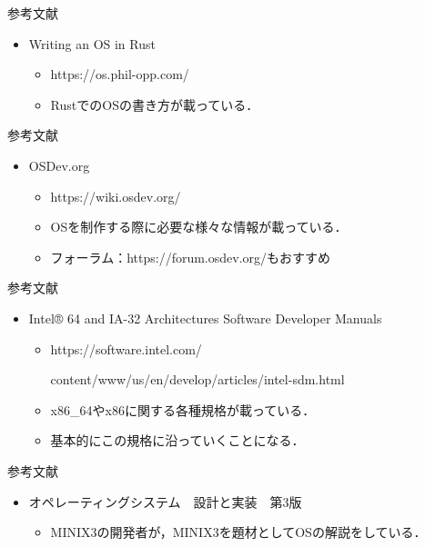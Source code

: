 \documentclass[titlepage,dvipdfmx,uplatex,a4j,12pt]{beamer}
\begin{document}
\begin{frame}{参考文献}
    \begin{itemize}
        \item Writing an OS in Rust
            \begin{itemize}
                \item https://os.phil-opp.com/
                \item RustでのOSの書き方が載っている．
            \end{itemize}
    \end{itemize}
\end{frame}

\begin{frame}{参考文献}
    \begin{itemize}
        \item OSDev.org
            \begin{itemize}
                \item https://wiki.osdev.org/
                \item OSを制作する際に必要な様々な情報が載っている．
                \item フォーラム：https://forum.osdev.org/もおすすめ
            \end{itemize}
    \end{itemize}
\end{frame}

\begin{frame}{参考文献}
    \begin{itemize}
        \item Intel® 64 and IA-32 Architectures Software Developer Manuals
            \begin{itemize}
                \item https://software.intel.com/

                    content/www/us/en/develop/articles/intel-sdm.html
                \item x86\_64やx86に関する各種規格が載っている．
                \item 基本的にこの規格に沿っていくことになる．
            \end{itemize}
    \end{itemize}
\end{frame}

\begin{frame}{参考文献}
    \begin{itemize}
        \item オペレーティングシステム　設計と実装　第3版
            \begin{itemize}
                \item MINIX3の開発者が，MINIX3を題材としてOSの解説をしている．
            \end{itemize}
    \end{itemize}
\end{frame}
\end{document}
